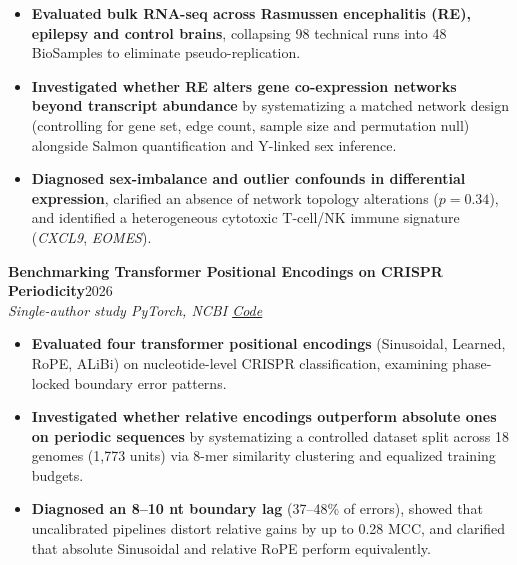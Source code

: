 \documentclass[10pt,letterpaper]{article}
\newcommand{\lnk}[2]{\href{#1}{\textcolor{link}{#2}}}
\newcommand{\proj}[3]{\needspace{4\baselineskip}\textbf{#1}\hfill #3\\ \textit{\small #2}\par}
\begin{document}
\begin{itemize}
  \item \textbf{Evaluated bulk RNA-seq across Rasmussen encephalitis (RE), epilepsy and control brains}, collapsing 98 technical runs into 48 BioSamples to eliminate pseudo-replication.
  \item \textbf{Investigated whether RE alters gene co-expression networks beyond transcript abundance} by systematizing a matched network design (controlling for gene set, edge count, sample size and permutation null) alongside Salmon quantification and Y-linked sex inference.
  \item \textbf{Diagnosed sex-imbalance and outlier confounds in differential expression}, clarified an absence of network topology alterations ($p = 0.34$), and identified a heterogeneous cytotoxic T-cell/NK immune signature (\textit{CXCL9}, \textit{EOMES}).
\end{itemize}
\proj{Benchmarking Transformer Positional Encodings on CRISPR Periodicity}{Single-author study \textbar{} PyTorch, NCBI \textbar{} \lnk{https://github.com/rozakter18/CRISPR-Positional-Encoding-Benchmark}{Code}}{2026}
\begin{itemize}
  \item \textbf{Evaluated four transformer positional encodings} (Sinusoidal, Learned, RoPE, ALiBi) on nucleotide-level CRISPR classification, examining phase-locked boundary error patterns.
  \item \textbf{Investigated whether relative encodings outperform absolute ones on periodic sequences} by systematizing a controlled dataset split across 18 genomes (1,773 units) via 8-mer similarity clustering and equalized training budgets.
  \item \textbf{Diagnosed an 8--10 nt boundary lag} (37--48\% of errors), showed that uncalibrated pipelines distort relative gains by up to 0.28 MCC, and clarified that absolute Sinusoidal and relative RoPE perform equivalently.
\end{itemize}
\end{document}
